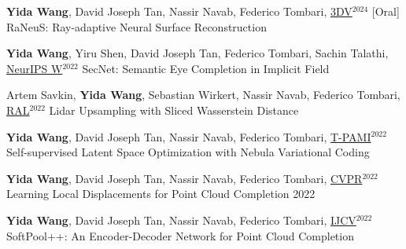 \begin{cventries}
\begin{enumerate}[label={[\arabic*]}, leftmargin=*]


\item 
\cvpublication
{\textbf{Yida Wang}, David Joseph Tan, Nassir Navab, Federico Tombari, \underline{3DV}$^{2024}$ [Oral]} %
{RaNeuS: Ray-adaptive Neural Surface Reconstruction} %
{} %
{} %

\item 
\cvpublication
{\textbf{Yida Wang}, Yiru Shen, David Joseph Tan, Federico Tombari, Sachin Talathi, \underline{NeurIPS W}$^{2022}$} %
{SecNet: Semantic Eye Completion in Implicit Field} %
{} %
{} %

\item 
\cvpublication
{Artem Savkin, \textbf{Yida Wang}, Sebastian Wirkert, Nassir Navab, Federico Tombari, \underline{RAL}$^{2022}$} %
{Lidar Upsampling with Sliced Wasserstein Distance} %
{} %
{} %

\item 
\cvpublication
{\textbf{Yida Wang}, David Joseph Tan, Nassir Navab, Federico Tombari, \underline{T-PAMI}$^{2022}$} %
{Self-supervised Latent Space Optimization with Nebula Variational Coding} %
{} %
{} %

\item 
\cvpublication
{\textbf{Yida Wang}, David Joseph Tan, Nassir Navab, Federico Tombari, \underline{CVPR}$^{2022}$} 
{Learning Local Displacements for Point Cloud Completion} %
{2022} %
{} %
{} %

\item 
\cvpublication
{\textbf{Yida Wang}, David Joseph Tan, Nassir Navab, Federico Tombari, \underline{IJCV}$^{2022}$} %
{SoftPool++: An Encoder-Decoder Network for Point Cloud Completion} %
{} %
{} %


\end{enumerate}
\end{cventries}
